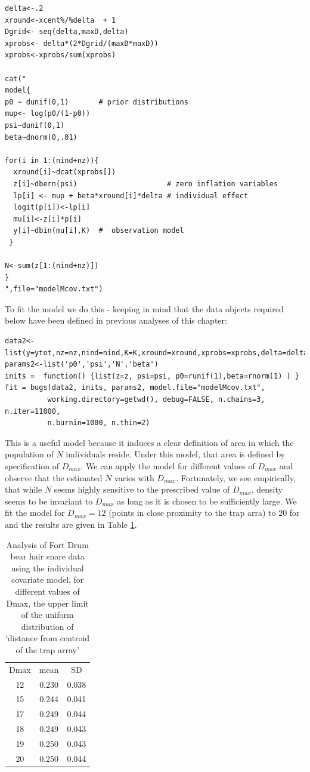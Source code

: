 {\small
\begin{verbatim}
delta<-.2
xround<-xcent%/%delta  + 1
Dgrid<- seq(delta,maxD,delta)
xprobs<- delta*(2*Dgrid/(maxD*maxD))
xprobs<-xprobs/sum(xprobs)

cat("
model{
p0 ~ dunif(0,1)       # prior distributions
mup<- log(p0/(1-p0))
psi~dunif(0,1)
beta~dnorm(0,.01)

for(i in 1:(nind+nz)){
  xround[i]~dcat(xprobs[])
  z[i]~dbern(psi)                     # zero inflation variables
  lp[i] <- mup + beta*xround[i]*delta # individual effect
  logit(p[i])<-lp[i]
  mu[i]<-z[i]*p[i]
  y[i]~dbin(mu[i],K)  #  observation model
 }

N<-sum(z[1:(nind+nz)])
}
",file="modelMcov.txt")
\end{verbatim}
}

To fit the model we do this - keeping in mind that the data objects
required below have been defined in previous analyses of this chapter:
{\small
\begin{verbatim}
data2<-list(y=ytot,nz=nz,nind=nind,K=K,xround=xround,xprobs=xprobs,delta=delta)
params2<-list('p0','psi','N','beta')
inits =  function() {list(z=z, psi=psi, p0=runif(1),beta=rnorm(1) ) }
fit = bugs(data2, inits, params2, model.file="modelMcov.txt",
          working.directory=getwd(), debug=FALSE, n.chains=3, n.iter=11000, 
          n.burnin=1000, n.thin=2)
\end{verbatim}
}

This is a useful model because it induces a clear definition of area
in which the population of $N$ individuals reside. Under this model,
that area is defined by specification of $D_{max}$. We can apply the model
for different values of $D_{max}$ and observe that the estimated $N$ varies
with $D_{max}$. Fortunately, we see empirically, that while $N$ seems
highly sensitive to the prescribed value of $D_{max}$, density seems to
be invariant to $D_{max}$ as long as it is chosen to be sufficiently
large. We fit the model for $D_{max}=12$ (points in close proximity to
the trap arra) to 20 for and the results are given in Table
\ref{closed.tab.Dmax}.


\begin{table}[htp]
\centering
\caption{Analysis of Fort Drum bear hair snare data using the individual covariate model, for different values of Dmax, the upper limit of the uniform distribution of `distance from centroid of the trap array' }
\begin{tabular}{ccc}
 Dmax & mean & SD \\
  12& 0.230 & 0.038 \\
  15& 0.244 &0.041 \\
  17& 0.249 &0.044 \\
  18& 0.249 &0.043\\
  19& 0.250 &0.043\\
  20& 0.250 &0.044
\end{tabular}
\label{closed.tab.Dmax}
\end{table}



